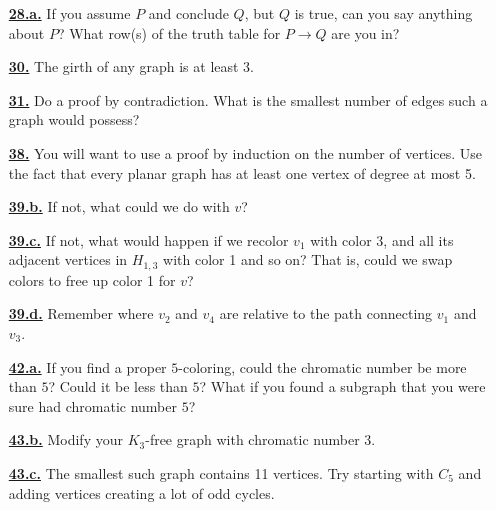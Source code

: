 \documentclass[10pt,]{book}
\theoremstyle{plain}
\theoremstyle{definition}
\theoremstyle{definition}
\theoremstyle{definition}
\numberwithin{equation}{chapter}
\def\imp{\rightarrow}
\begin{document}
\begin{itemize}[itemsep=1em]
\hypertarget{a-28.a}{}\item[\textbf{\hyperref[task-39]{28.a.}}]
\hypertarget{p-283}{}%
If you assume \(P\) and conclude \(Q\), but \(Q\) is true, can you say anything about \(P\)?  What row(s) of the truth table for \(P \imp Q\) are you in?%

\hypertarget{a-30}{}\item[\textbf{\hyperref[activity-25]{30.}}]
\hypertarget{p-295}{}%
The girth of any graph is at least 3.%

\hypertarget{a-31}{}\item[\textbf{\hyperref[act-planardeg5]{31.}}]
\hypertarget{p-298}{}%
Do a proof by contradiction.  What is the smallest number of edges such a graph would possess?%

\hypertarget{a-38}{}\item[\textbf{\hyperref[activity-31]{38.}}]
\hypertarget{p-353}{}%
You will want to use a proof by induction on the number of vertices.  Use the fact that every planar graph has at least one vertex of degree at most 5.%

\hypertarget{a-39.b}{}\item[\textbf{\hyperref[task-51]{39.b.}}]
\hypertarget{p-358}{}%
If not, what could we do with \(v\)?%

\hypertarget{a-39.c}{}\item[\textbf{\hyperref[task-52]{39.c.}}]
\hypertarget{p-360}{}%
If not, what would happen if we recolor \(v_1\) with color 3, and all its adjacent vertices in \(H_{1,3}\) with color 1 and so on?  That is, could we swap colors to free up color 1 for \(v\)?%

\hypertarget{a-39.d}{}\item[\textbf{\hyperref[task-53]{39.d.}}]
\hypertarget{p-362}{}%
Remember where \(v_2\) and \(v_4\) are relative to the path connecting \(v_1\) and \(v_3\).%

\hypertarget{a-42.a}{}\item[\textbf{\hyperref[task-54]{42.a.}}]
\hypertarget{p-376}{}%
If you find a proper \(5\)-coloring, could the chromatic number be more than \(5\)?  Could it be less than \(5\)?  What if you found a subgraph that you were sure had chromatic number \(5\)?%

\hypertarget{a-43.b}{}\item[\textbf{\hyperref[task-58]{43.b.}}]
\hypertarget{p-382}{}%
Modify your \(K_3\)-free graph with chromatic number 3.%

\hypertarget{a-43.c}{}\item[\textbf{\hyperref[task-59]{43.c.}}]
\hypertarget{p-384}{}%
The smallest such graph contains 11 vertices.  Try starting with \(C_5\) and adding vertices creating a lot of odd cycles.%


\end{itemize}
\end{document}

